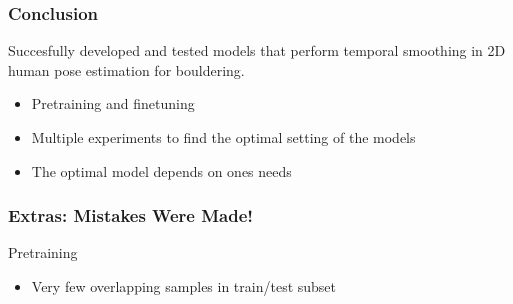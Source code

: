 \documentclass{beamer}
\begin{document}
\begin{frame}
    \frametitle{Conclusion}
    Succesfully developed and tested models that perform temporal smoothing in 2D human pose estimation for bouldering.
    \begin{itemize}
        \item Pretraining and finetuning
        \item Multiple experiments to find the optimal setting of the models
        \item The optimal model depends on ones needs
    \end{itemize}
\end{frame}

\begin{frame}
    \frametitle{Extras: Mistakes Were Made!}
    Pretraining
    \begin{itemize}
        \item Very few overlapping samples in train/test subset
    \end{itemize}
\end{frame}
\end{document}
